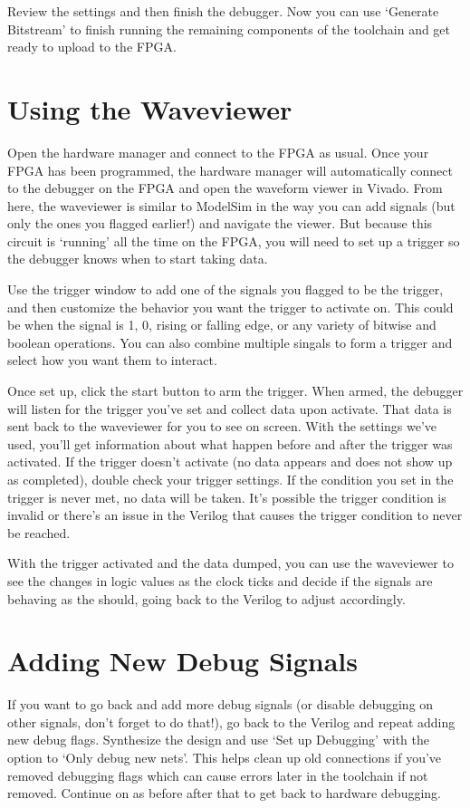 \documentclass{article}
\begin{document}
Review the settings and then finish the debugger.  Now you can use
`Generate Bitstream' to finish running the remaining components of the
toolchain and get ready to upload to the FPGA. 	
	
\section{Using the Waveviewer}
Open the hardware manager and connect to the FPGA as usual.  Once your
FPGA has been programmed, the hardware manager will automatically
connect to the debugger on the FPGA and open the waveform viewer in
Vivado.  From here, the waveviewer is similar to ModelSim in the way
you can add signals (but only the ones you flagged earlier!) and
navigate the viewer.  But because this circuit is `running' all the
time on the FPGA, you will need to set up a trigger so the debugger
knows when to start taking data.
	
Use the trigger window to add one of the signals you flagged to be the
trigger, and then customize the behavior you want the trigger to
activate on.  This could be when the signal is 1, 0, rising or falling
edge, or any variety of bitwise and boolean operations.  You can also
combine multiple singals to form a trigger and select how you want
them to interact.
	
Once set up, click the start button to arm the trigger.  When armed,
the debugger will listen for the trigger you've set and collect data
upon activate.  That data is sent back to the waveviewer for you to
see on screen.  With the settings we've used, you'll get information
about what happen before and after the trigger was activated.  If the
trigger doesn't activate (no data appears and does not show up as
completed), double check your trigger settings.  If the condition you
set in the trigger is never met, no data will be taken.  It's possible
the trigger condition is invalid or there's an issue in the Verilog
that causes the trigger condition to never be reached.
	
With the trigger activated and the data dumped, you can use the
waveviewer to see the changes in logic values as the clock ticks and
decide if the signals are behaving as the should, going back to the
Verilog to adjust accordingly.
	
\section{Adding New Debug Signals}
If you want to go back and add more debug signals (or disable
debugging on other signals, don't forget to do that!), go back to the
Verilog and repeat adding new debug flags.  Synthesize the design and
use `Set up Debugging' with the option to `Only debug new nets'.  This
helps clean up old connections if you've removed debugging flags which
can cause errors later in the toolchain if not removed.  Continue on
as before after that to get back to hardware debugging.
	
\end{document}
